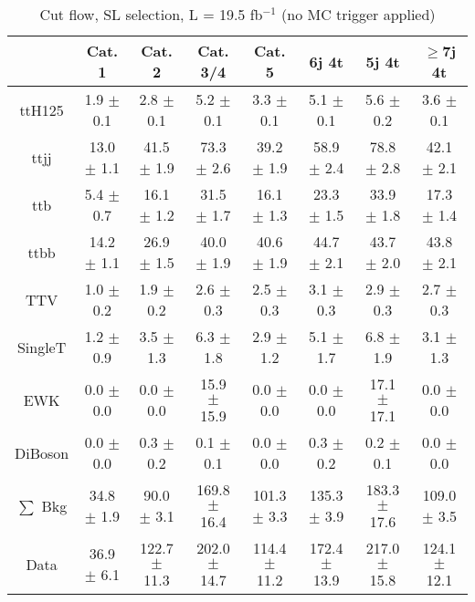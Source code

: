\documentclass{article}
\begin{document}
        \begin{table*}[htbp]
        \begin{center}
\label{tab:cutflow}
\begin{tabular}{| c| c| c| c| c| c| c| c| }
\hline
 & Cat. 1  & Cat. 2  & Cat. 3/4  & Cat. 5  & 6j 4t  & 5j 4t  & $\ge$7j 4t \\ \hline
ttH125 &  1.9 $\pm$ 0.1  &  2.8 $\pm$ 0.1  &  5.2 $\pm$ 0.1  &  3.3 $\pm$ 0.1  &  5.1 $\pm$ 0.1  &  5.6 $\pm$ 0.2  &  3.6 $\pm$ 0.1 \\
ttjj &  13.0 $\pm$ 1.1  &  41.5 $\pm$ 1.9  &  73.3 $\pm$ 2.6  &  39.2 $\pm$ 1.9  &  58.9 $\pm$ 2.4  &  78.8 $\pm$ 2.8  &  42.1 $\pm$ 2.1 \\
ttb &  5.4 $\pm$ 0.7  &  16.1 $\pm$ 1.2  &  31.5 $\pm$ 1.7  &  16.1 $\pm$ 1.3  &  23.3 $\pm$ 1.5  &  33.9 $\pm$ 1.8  &  17.3 $\pm$ 1.4 \\
ttbb &  14.2 $\pm$ 1.1  &  26.9 $\pm$ 1.5  &  40.0 $\pm$ 1.9  &  40.6 $\pm$ 1.9  &  44.7 $\pm$ 2.1  &  43.7 $\pm$ 2.0  &  43.8 $\pm$ 2.1 \\
TTV &  1.0 $\pm$ 0.2  &  1.9 $\pm$ 0.2  &  2.6 $\pm$ 0.3  &  2.5 $\pm$ 0.3  &  3.1 $\pm$ 0.3  &  2.9 $\pm$ 0.3  &  2.7 $\pm$ 0.3 \\
SingleT &  1.2 $\pm$ 0.9  &  3.5 $\pm$ 1.3  &  6.3 $\pm$ 1.8  &  2.9 $\pm$ 1.2  &  5.1 $\pm$ 1.7  &  6.8 $\pm$ 1.9  &  3.1 $\pm$ 1.3 \\
EWK &  0.0 $\pm$ 0.0  &  0.0 $\pm$ 0.0  &  15.9 $\pm$ 15.9  &  0.0 $\pm$ 0.0  &  0.0 $\pm$ 0.0  &  17.1 $\pm$ 17.1  &  0.0 $\pm$ 0.0 \\
DiBoson &  0.0 $\pm$ 0.0  &  0.3 $\pm$ 0.2  &  0.1 $\pm$ 0.1  &  0.0 $\pm$ 0.0  &  0.3 $\pm$ 0.2  &  0.2 $\pm$ 0.1  &  0.0 $\pm$ 0.0 \\
\hline
$\sum$ Bkg &  34.8 $\pm$ 1.9  &  90.0 $\pm$ 3.1  &  169.8 $\pm$ 16.4  &  101.3 $\pm$ 3.3  &  135.3 $\pm$ 3.9  &  183.3 $\pm$ 17.6  &  109.0 $\pm$ 3.5 \\
\hline
Data &  36.9 $\pm$ 6.1  &  122.7 $\pm$ 11.3  &  202.0 $\pm$ 14.7  &  114.4 $\pm$ 11.2  &  172.4 $\pm$ 13.9  &  217.0 $\pm$ 15.8  &  124.1 $\pm$ 12.1 \\
\hline

        \end{tabular}

\caption{Cut flow, SL selection,   L = 19.5 fb$^{-1}$  (no MC trigger applied)  }
   
     \end{center}
        \end{table*}

        
\end{document}
